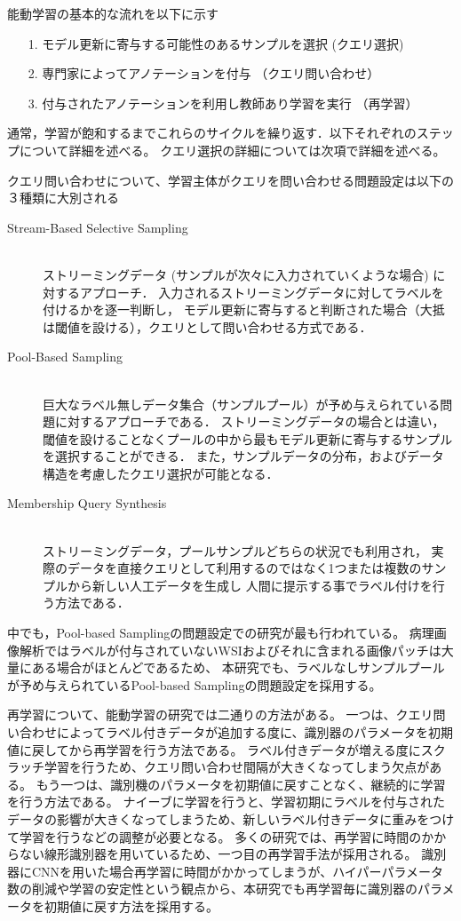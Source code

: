 能動学習の基本的な流れを以下に示す
\begin{itemize}
    \item[1.] モデル更新に寄与する可能性のあるサンプルを選択 (クエリ選択)
    \item[2.] 専門家によってアノテーションを付与 （クエリ問い合わせ）
    \item[3.] 付与されたアノテーションを利用し教師あり学習を実行 （再学習）
\end{itemize}
通常，学習が飽和するまでこれらのサイクルを繰り返す．以下それぞれのステップについて詳細を述べる。
クエリ選択の詳細については次項で詳細を述べる。 

クエリ問い合わせについて、学習主体がクエリを問い合わせる問題設定は以下の３種類に大別される
\begin{description}
    \item[Stream-Based Selective Sampling]\mbox{}\\
        ストリーミングデータ (サンプルが次々に入力されていくような場合) に対するアプローチ．
        入力されるストリーミングデータに対してラベルを付けるかを逐一判断し，
        モデル更新に寄与すると判断された場合（大抵は閾値を設ける），クエリとして問い合わせる方式である．
    \item[Pool-Based Sampling]\mbox{}\\
        巨大なラベル無しデータ集合（サンプルプール）が予め与えられている問題に対するアプローチである．
        ストリーミングデータの場合とは違い，閾値を設けることなくプールの中から最もモデル更新に寄与するサンプルを選択することができる．
        また，サンプルデータの分布，およびデータ構造を考慮したクエリ選択が可能となる．
    \item[Membership Query Synthesis]\mbox{}\\ 
        ストリーミングデータ，プールサンプルどちらの状況でも利用され，
        実際のデータを直接クエリとして利用するのではなく1つまたは複数のサンプルから新しい人工データを生成し
        人間に提示する事でラベル付けを行う方法である．
\end{description}
中でも，Pool-based Samplingの問題設定での研究が最も行われている。
病理画像解析ではラベルが付与されていないWSIおよびそれに含まれる画像パッチは大量にある場合がほとんどであるため、
本研究でも、ラベルなしサンプルプールが予め与えられているPool-based Samplingの問題設定を採用する。

再学習について、能動学習の研究では二通りの方法がある。
一つは、クエリ問い合わせによってラベル付きデータが追加する度に、識別器のパラメータを初期値に戻してから再学習を行う方法である。
ラベル付きデータが増える度にスクラッチ学習を行うため、クエリ問い合わせ間隔が大きくなってしまう欠点がある。
もう一つは、識別機のパラメータを初期値に戻すことなく、継続的に学習を行う方法である。
ナイーブに学習を行うと、学習初期にラベルを付与されたデータの影響が大きくなってしまうため、新しいラベル付きデータに重みをつけて学習を行うなどの調整が必要となる。
多くの研究では、再学習に時間のかからない線形識別器を用いているため、一つ目の再学習手法が採用される。
識別器にCNNを用いた場合再学習に時間がかかってしまうが、ハイパーパラメータ数の削減や学習の安定性という観点から、本研究でも再学習毎に識別器のパラメータを初期値に戻す方法を採用する。

